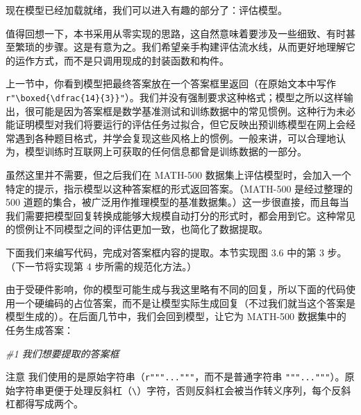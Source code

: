 现在模型已经加载就绪，我们可以进入有趣的部分了：评估模型。

值得回想一下，本书采用从零实现的思路，这自然意味着要涉及一些细致、有时甚至繁琐的步骤。这是有意为之。我们希望亲手构建评估流水线，从而更好地理解它的运作方式，而不是只调用现成的封装函数和构件。

上一节中，你看到模型把最终答案放在一个答案框里返回（在原始文本中写作 \texttt{r}\texttt{"}\texttt{\textbackslash{}boxed\{\textbackslash dfrac\{14\}\{3\}\}}\texttt{"}）。我们并没有强制要求这种格式；模型之所以这样输出，很可能是因为答案框是数学基准测试和训练数据中的常见惯例。这种行为未必能证明模型对我们将要运行的评估任务过拟合，但它反映出预训练模型在网上会经常遇到各种题目格式，并学会复现这些风格上的惯例。一般来讲，可以合理地认为，模型训练时互联网上可获取的任何信息都曾是训练数据的一部分。

虽然这里并不需要，但之后我们在 MATH-500 数据集上评估模型时，会加入一个特定的提示，指示模型以这种答案框的形式返回答案。（MATH-500 是经过整理的 500 道题的集合，被广泛用作推理模型的基准数据集。）这一步很直接，而且每当我们需要把模型回复转换成能够大规模自动打分的形式时，都会用到它。这种常见的惯例让不同模型之间的评估更加一致，也简化了数据提取。

下面我们来编写代码，完成对答案框内容的提取。本节实现图 3.6 中的第 3 步。（下一节将实现第 4 步所需的规范化方法。）


由于受硬件影响，你的模型可能生成与我这里略有不同的回复，所以下面的代码使用一个硬编码的占位答案，而不是让模型实际生成回复（不过我们就当这个答案是模型生成的）。在后面几节中，我们会回到模型，让它为 MATH-500 数据集中的任务生成答案：

{\noindent\small\textit{\#1 我们想要提取的答案框}\par}

\begin{myWarning}{注意}
 我们使用的是原始字符串（\texttt{r}\texttt{"""}\texttt{...}\texttt{"""}，而不是普通字符串 \texttt{"""}\texttt{...}\texttt{"""}）。原始字符串更便于处理反斜杠（\texttt{\textbackslash}）字符，否则反斜杠会被当作转义序列，每个反斜杠都得写成两个。\end{myWarning}

